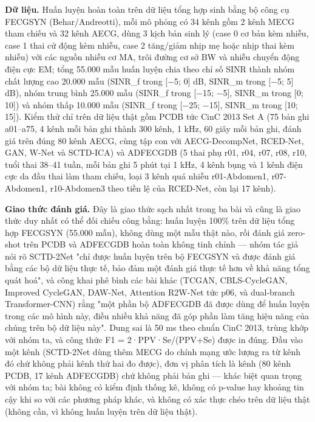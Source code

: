 \documentclass[12pt,a4paper]{article}
\begin{document}
\noindent \textbf{Dữ liệu.} Huấn luyện hoàn toàn trên dữ liệu tổng hợp sinh bằng bộ công cụ FECGSYN (Behar/Andreotti), mỗi mô phỏng có 34 kênh gồm 2 kênh MECG tham chiếu và 32 kênh AECG, dùng 3 kịch bản sinh lý (case 0 cơ bản kèm nhiễu, case 1 thai cử động kèm nhiễu, case 2 tăng/giảm nhịp mẹ hoặc nhịp thai kèm nhiễu) với các nguồn nhiễu cơ MA, trôi đường cơ sở BW và nhiễu chuyển động điện cực EM; tổng 55.000 mẫu huấn luyện chia theo chỉ số SINR thành nhóm chất lượng cao 20.000 mẫu (SINR\_f trong [−5; 0] dB, SINR\_m trong [−5; 5] dB), nhóm trung bình 25.000 mẫu (SINR\_f trong [−15; −5], SINR\_m trong [0; 10]) và nhóm thấp 10.000 mẫu (SINR\_f trong [−25; −15], SINR\_m trong [10; 15]). Kiểm thử chỉ trên dữ liệu thật gồm PCDB tức CinC 2013 Set A (75 bản ghi a01–a75, 4 kênh mỗi bản ghi thành 300 kênh, 1 kHz, 60 giây mỗi bản ghi, đánh giá trên đúng 80 kênh AECG, cùng tập con với AECG-DecompNet, RCED-Net, GAN, W-Net và SCTD-ICA) và ADFECGDB (5 thai phụ r01, r04, r07, r08, r10, tuổi thai 38–41 tuần, mỗi bản ghi 5 phút tại 1 kHz, 4 kênh bụng và 1 kênh điện cực da đầu thai làm tham chiếu, loại 3 kênh quá nhiễu r01-Abdomen1, r07-Abdomen1, r10-Abdomen3 theo tiền lệ của RCED-Net, còn lại 17 kênh).\par\vspace{3pt}
\noindent \textbf{Giao thức đánh giá.} Đây là giao thức sạch nhất trong ba bài và cũng là giao thức duy nhất có thể đối chiếu công bằng: huấn luyện 100\% trên dữ liệu tổng hợp FECGSYN (55.000 mẫu), không dùng một mẫu thật nào, rồi đánh giá zero-shot trên PCDB và ADFECGDB hoàn toàn không tinh chỉnh — nhóm tác giả nói rõ SCTD-2Net "chỉ được huấn luyện trên bộ FECGSYN và được đánh giá bằng các bộ dữ liệu thực tế, bảo đảm một đánh giá thực tế hơn về khả năng tổng quát hoá", và công khai phê bình các bài khác (TCGAN, CBLS-CycleGAN, Improved CycleGAN, DAW-Net, Attention R2W-Net tức p06, và dual-branch Transformer-CNN) rằng "một phần bộ ADFECGDB đã được dùng để huấn luyện trong các mô hình này, điều nhiều khả năng đã góp phần làm tăng hiệu năng của chúng trên bộ dữ liệu này". Dung sai là 50 ms theo chuẩn CinC 2013, trùng khớp với nhóm ta, và công thức F1 = 2·PPV·Se/(PPV+Se) được in đúng. Đầu vào một kênh (SCTD-2Net dùng thêm MECG do chính mạng ước lượng ra từ kênh đó chứ không phải kênh thứ hai đo được), đơn vị phân tích là kênh (80 kênh PCDB, 17 kênh ADFECGDB) chứ không phải bản ghi — khác biệt quan trọng với nhóm ta; bài không có kiểm định thống kê, không có p-value hay khoảng tin cậy khi so với các phương pháp khác, và không có xác thực chéo trên dữ liệu thật (không cần, vì không huấn luyện trên dữ liệu thật).\par\vspace{3pt}
\end{document}
